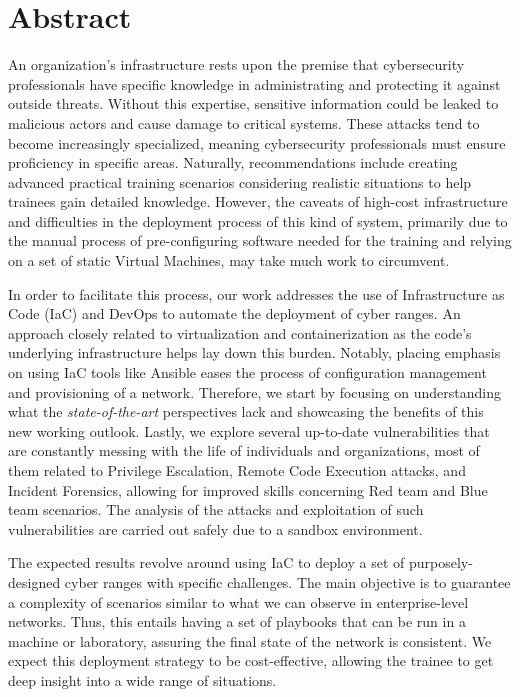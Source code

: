 \chapter*{Abstract}

An organization's infrastructure rests upon the premise that cybersecurity professionals have specific knowledge in administrating and protecting it against outside threats. Without this expertise, sensitive information could be leaked to malicious actors and cause damage to critical systems. These attacks tend to become increasingly specialized, meaning cybersecurity professionals must ensure proficiency in specific areas. Naturally, recommendations include creating advanced practical training scenarios considering realistic situations to help trainees gain detailed knowledge. However, the caveats of high-cost infrastructure and difficulties in the deployment process of this kind of system, primarily due to the manual process of pre-configuring software needed for the training and relying on a set of static Virtual Machines, may take much work to circumvent.

In order to facilitate this process, our work addresses the use of Infrastructure as Code (IaC) and DevOps to automate the deployment of cyber ranges. An approach closely related to virtualization and containerization as the code's underlying infrastructure helps lay down this burden. Notably, placing emphasis on using IaC tools like Ansible eases the process of configuration management and provisioning of a network. Therefore, we start by focusing on understanding what the \textit{state-of-the-art} perspectives lack and showcasing the benefits of this new working outlook. Lastly, we explore several up-to-date vulnerabilities that are constantly messing with the life of individuals and organizations, most of them related to Privilege Escalation, Remote Code Execution attacks, and Incident Forensics, allowing for improved skills concerning Red team and Blue team scenarios. The analysis of the attacks and exploitation of such vulnerabilities are carried out safely due to a sandbox environment.

The expected results revolve around using IaC to deploy a set of purposely-designed cyber ranges with specific challenges. The main objective is to guarantee a complexity of scenarios similar to what we can observe in enterprise-level networks. Thus, this entails having a set of playbooks that can be run in a machine or laboratory, assuring the final state of the network is consistent. We expect this deployment strategy to be cost-effective, allowing the trainee to get deep insight into a wide range of situations.

